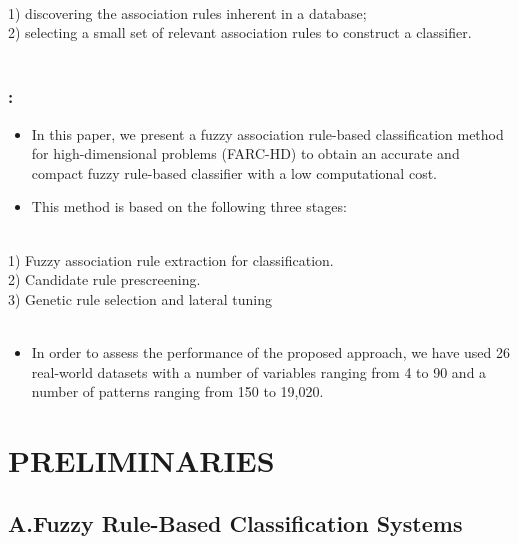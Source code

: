 \documentclass{beamer}
\begin{document}
\begin{CJK*}{UTF8}{bsmi}
\begin{frame}
\begin{block}{ }
		~\\
		1) discovering the association rules inherent in a database; \\
		2) selecting a small set of relevant association rules to construct a classifier.\\
		~\\
	\end{block}
	
\end{frame}



\begin{frame}
	\frametitle{\insertsection : \insertsubsection}
	\begin{itemize}
		\item In this paper, we present a fuzzy association rule-based classification method for high-dimensional problems (FARC-HD) to obtain an accurate and compact fuzzy rule-based classifier with a low computational cost.
		\item This method is based on the following three stages:
	\end{itemize}
	\begin{block}{ }
		
		~\\
		1) Fuzzy association rule extraction for classification.\\
		2) Candidate rule prescreening.\\
		3) Genetic rule selection and lateral tuning\\
		~\\
	\end{block}
	\begin{itemize}
	\item In order to assess the performance of the proposed approach, we have used 26 real-world datasets with a number of variables ranging from 4 to 90 and a number of patterns ranging from 150 to 19,020.
	\end{itemize}
\end{frame}



\section{PRELIMINARIES}
\subsection{A.Fuzzy Rule-Based Classification Systems}


\end{CJK*}
\end{document}
